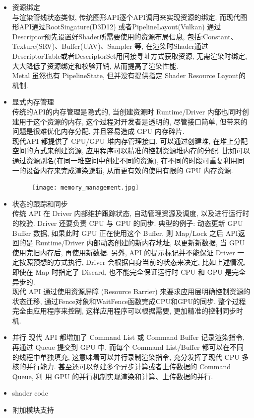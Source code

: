 \documentclass[UTF8]{ctexart}
\begin{document}
\begin{itemize}
\begin{figure}[h]
    \centering
  \end{figure}
\item 资源绑定
  \\与渲染管线状态类似, 传统图形API逐个API调用来实现资源的绑定. 而现代图形API通过RootSingature(D3D12) 或者PipelineLayout(Vulkan) 通过Descriptor预先设置好Shader所需要使用的资源布局信息, 包括:Constant、Texture(SRV)、Buffer(UAV)、Sampler 等, 在渲染时Shader通过DescriptorTable或者DescriptorSet用间接寻址方式获取资源, 无需渲染时绑定, 大大降低了资源绑定和校验开销, 从而提高了渲染性能.
  \\Metal 虽然也有 PipelineState, 但并没有提供指定 Shader Resource Layout的机制.
\item 显式内存管理
  \\传统的API的内存管理是隐式的, 当创建资源时 Runtime/Driver 内部也同时创建用于这个资源的内存, 这个过程对开发者是透明的, 尽管接口简单, 但带来的问题是很难优化内存分配, 并且容易造成 GPU 内存碎片.
  \\现代API 都提供了 CPU/GPU 堆内存管理接口, 可以通过创建堆, 在堆上分配空间的方式来创建资源, 应用程序可以精准的控制资源堆内存的分配. 比如可以通过资源别名(在同一堆空间中创建不同的资源), 在不同的时段可重复利用同一的设备内存来完成渲染逻辑, 从而更有效的使用有限的 GPU 内存资源.
  \begin{figure}[h]
    \texttt{[image: memory\_management.jpg]}
    \centering
  \end{figure}
\item 状态的跟踪和同步
  \\传统 API 在 Driver 内部维护跟踪状态, 自动管理资源及调度, 以及进行运行时的校验. Driver 还要负责 CPU 与 GPU 的同步. 典型的例子: 动态更新 GPU Buffer 数据, 如果此时 GPU 正在使用这个 Buffer, 则 Map/Lock 之后 API返回的是 Runtime/Driver 内部动态创建的新内存地址, 以更新新数据, 当 GPU 使用完旧内存后, 再使用新数据. 另外, API 的提示标记并不能保证 Driver 一定按照预想的方式执行, Driver 会根据自身当前的状态来决定, 比如上述情况, 即使在 Map 时指定了 Discard, 也不能完全保证运行时 CPU 和 GPU 是完全异步的.
  \\现代 API 通过使用资源屏障 (Resource Barrier) 来要求应用层明确控制资源的状态迁移, 通过Fence对象和WaitFence函数完成CPU和GPU的同步. 整个过程完全由应用程序来控制, 这样应用程序可以根据需要, 更加精准的控制同步时机.
\item 并行
  现代 API 都增加了 Command List 或 Command Buffer 记录渲染指令, 再通过 Queue 提交到 GPU 中, 而每个 Command List/Buffer 都可以在不同的线程中单独填充, 这意味着可以并行录制渲染指令, 充分发挥了现代 CPU 多核的并行能力. 甚至还可以创建多个异步计算或者上传数据的 Command Queue, 利  用 GPU 的并行机制实现渲染和计算、上传数据的并行.
\item shader code
\item 附加模块支持
\end{itemize}
\end{document}
